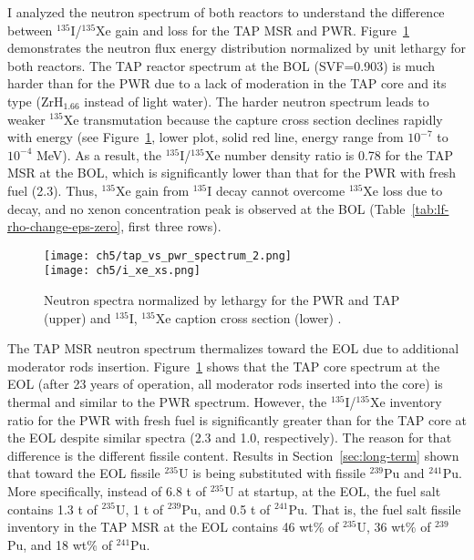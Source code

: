I analyzed the neutron spectrum of both reactors to understand the difference 
between $^{135}$I/$^{135}$Xe gain and loss for the \gls{TAP} \gls{MSR} and 
\gls{PWR}. Figure~\ref{fig:tap-pwr-spectrum} 
demonstrates the neutron flux energy distribution normalized by unit lethargy 
for both reactors. The \gls{TAP} reactor spectrum at the \gls{BOL} (SVF=0.903) 
is much harder than for the \gls{PWR} due to a lack of moderation in the 
\gls{TAP} core and its type (ZrH$_{1.66}$ instead of light water). The harder 
neutron spectrum leads to weaker $^{135}$Xe transmutation because the capture 
cross section declines rapidly with energy (see 
Figure~\ref{fig:tap-pwr-spectrum}, lower plot, solid red line, energy range 
from $10^{-7}$ to $10^{-4}$ MeV). As a result, the $^{135}$I/$^{135}$Xe number 
density ratio is 0.78 for the \gls{TAP} \gls{MSR} at the \gls{BOL}, which is 
significantly lower than that for the \gls{PWR} with fresh fuel (2.3). 
Thus, $^{135}$Xe gain from $^{135}$I decay cannot overcome $^{135}$Xe loss due 
to decay, and no xenon concentration peak is observed at the \gls{BOL} 
(Table~\ref{tab:lf-rho-change-eps-zero}, first three rows).
\begin{figure}[hbp!] %
	\centering
	\texttt{[image: ch5/tap\_vs\_pwr\_spectrum\_2.png]}\\
	\vspace{-19mm}
	\hspace{+0.05mm}
	\texttt{[image: ch5/i\_xe\_xs.png]}
	\vspace{-8mm}
	\caption{Neutron spectra normalized by lethargy for the \gls{PWR} and 
		\gls{TAP} (upper) and $^{135}$I, $^{135}$Xe caption cross 
		section (lower) \cite{rykhlevskii_impact_2019}.}
	\label{fig:tap-pwr-spectrum}
\end{figure}


The \gls{TAP} \gls{MSR} neutron spectrum thermalizes toward the \gls{EOL} due 
to additional moderator rods insertion. Figure~\ref{fig:tap-pwr-spectrum} 
shows that the \gls{TAP} core spectrum at the \gls{EOL} (after 23 years of 
operation, all moderator rods inserted into the core) is thermal and  similar 
to the \gls{PWR} spectrum. However, the $^{135}$I/$^{135}$Xe inventory ratio 
for the \gls{PWR} with fresh fuel is significantly greater than for the 
\gls{TAP} core at the \gls{EOL} despite similar spectra (2.3 and 1.0, 
respectively). The reason for that difference is the different fissile 
content. Results in Section~\ref{sec:long-term} shown that toward the 
\gls{EOL} fissile $^{235}$U is being substituted with fissile $^{239}$Pu and 
$^{241}$Pu. More specifically, instead of 6.8 t of $^{235}$U at startup, 
at the \gls{EOL}, the fuel salt contains 1.3 t of $^{235}$U, 1 t of 
$^{239}$Pu, and 0.5 t of $^{241}$Pu. That is, the fuel salt fissile inventory 
in the \gls{TAP} \gls{MSR} at the \gls{EOL} contains 46 wt\% of $^{235}$U, 36 
wt\% of $^{239}$Pu, and 18 wt\% of $^{241}$Pu.

